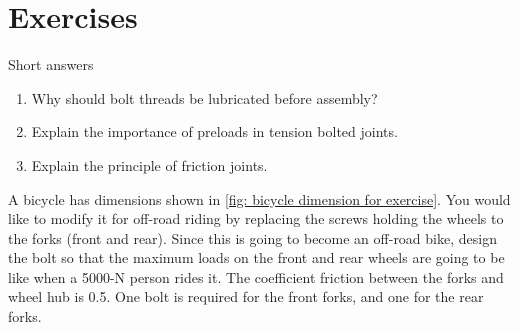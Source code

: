 \documentclass[
10pt,
a4paper,
openany,
svgnames,
]{book}
\newcommand{\exercise}{%
\item \label{lab:\arabic{chapter}.\arabic{exercisesi}}  %
}
\begin{document}
\section*{Exercises}

\begin{exercises}
  \exercise Short answers
  \begin{enumerate}
  \item Why should bolt threads be lubricated before assembly?
  \item Explain the importance of preloads in tension bolted joints.
  \item Explain the principle of friction joints.
  \end{enumerate}
  
  \exercise \label{exercise: bolt for bicycle fork} A bicycle has dimensions shown in \cref{fig: bicycle dimension for exercise}. You would like to modify it for off-road riding by replacing the screws holding the wheels to the forks (front and rear). Since this is going to become an off-road bike, design the bolt so that the maximum loads on the front and rear wheels are going to be like when a 5000-N person rides it. The coefficient friction between the forks and wheel hub is 0.5. One bolt is required for the front forks, and one for the rear forks.
  

\end{exercises}
\end{document}
